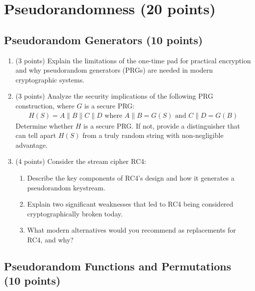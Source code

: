 \documentclass[10pt,a4paper,american]{article}
\begin{document}
\section{Pseudorandomness (20 points)}

\subsection{Pseudorandom Generators (10 points)}

\begin{enumerate}
	\item (3 points) Explain the limitations of the one-time pad for practical encryption and why pseudorandom generators (PRGs) are needed in modern cryptographic systems.

	\item (3 points) Analyze the security implications of the following PRG construction, where $G$ is a secure PRG:
	      \begin{align*}
		      H(S) = A \| B \| C \| D \text{ where } A \| B = G(S) \text{ and } C \| D = G(B)
	      \end{align*}
	      Determine whether $H$ is a secure PRG. If not, provide a distinguisher that can tell apart $H(S)$ from a truly random string with non-negligible advantage.

	\item (4 points) Consider the stream cipher RC4:
	      \begin{enumerate}
		      \item Describe the key components of RC4's design and how it generates a pseudorandom keystream.
		      \item Explain two significant weaknesses that led to RC4 being considered cryptographically broken today.
		      \item What modern alternatives would you recommend as replacements for RC4, and why?
	      \end{enumerate}
\end{enumerate}

\subsection{Pseudorandom Functions and Permutations (10 points)}
\end{document}
